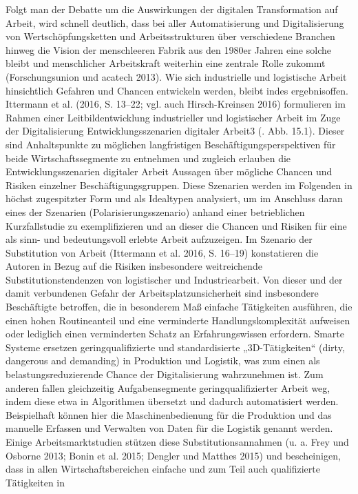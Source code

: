 Folgt man der Debatte um die Auswirkungen der digitalen Transformation auf Arbeit, wird schnell deutlich,
dass bei aller Automatisierung und Digitalisierung von
Wertschöpfungsketten und Arbeitsstrukturen über
verschiedene Branchen hinweg die Vision der menschleeren Fabrik aus den 1980er Jahren eine solche bleibt
und menschlicher Arbeitskraft weiterhin eine zentrale
Rolle zukommt (Forschungsunion und acatech 2013).
Wie sich industrielle und logistische Arbeit hinsichtlich Gefahren und Chancen entwickeln werden, bleibt
indes ergebnisoffen. Ittermann et al. (2016, S. 13–22;
vgl. auch Hirsch-Kreinsen 2016) formulieren im Rahmen einer Leitbildentwicklung industrieller und logistischer Arbeit im Zuge der Digitalisierung Entwicklungsszenarien digitaler Arbeit3 (. Abb. 15.1). Dieser
sind Anhaltspunkte zu möglichen langfristigen Beschäftigungsperspektiven für beide Wirtschaftssegmente zu entnehmen und zugleich erlauben die Entwicklungsszenarien digitaler Arbeit Aussagen über
mögliche Chancen und Risiken einzelner Beschäftigungsgruppen. Diese Szenarien werden im Folgenden
in höchst zugespitzter Form und als Idealtypen analysiert, um im Anschluss daran eines der Szenarien (Polarisierungsszenario) anhand einer betrieblichen
Kurzfallstudie zu exemplifizieren und an dieser die
Chancen und Risiken für eine als sinn- und bedeutungsvoll erlebte Arbeit aufzuzeigen.
Im Szenario der Substitution von Arbeit (Ittermann
et al. 2016, S. 16–19) konstatieren die Autoren in Bezug
auf die Risiken insbesondere weitreichende Substitutionstendenzen von logistischer und Industriearbeit.
Von dieser und der damit verbundenen Gefahr der
Arbeitsplatzunsicherheit sind insbesondere Beschäftigte betroffen, die in besonderem Maß einfache Tätigkeiten ausführen, die einen hohen Routineanteil und
eine verminderte Handlungskomplexität aufweisen
oder lediglich einen verminderten Schatz an Erfahrungswissen erfordern. Smarte Systeme ersetzen geringqualifizierte und standardisierte „3D-Tätigkeiten“
(dirty, dangerous and demanding) in Produktion und
Logistik, was zum einen als belastungsreduzierende
Chance der Digitalisierung wahrzunehmen ist. Zum
anderen fallen gleichzeitig Aufgabensegmente geringqualifizierter Arbeit weg, indem diese etwa in
Algorithmen übersetzt und dadurch automatisiert
werden. Beispielhaft können hier die Maschinenbedienung für die Produktion und das manuelle Erfassen
und Verwalten von Daten für die Logistik genannt
werden. Einige Arbeitsmarktstudien stützen diese
Substitutionsannahmen (u. a. Frey und Osborne 2013;
Bonin et al. 2015; Dengler und Matthes 2015) und
bescheinigen, dass in allen Wirtschaftsbereichen einfache und zum Teil auch qualifizierte Tätigkeiten in
